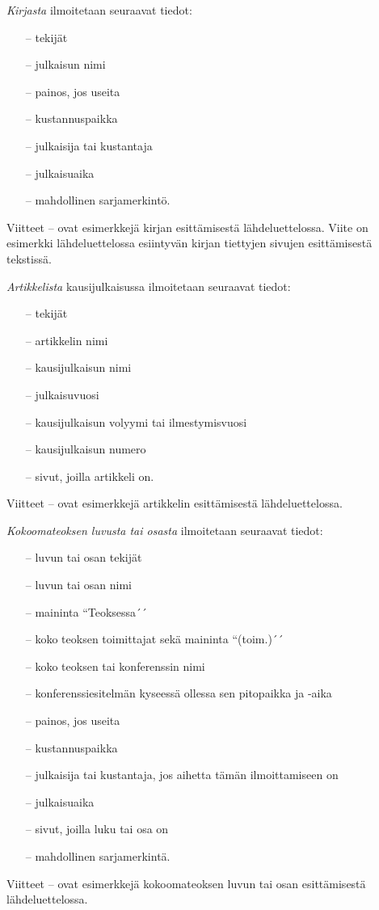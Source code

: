 \documentclass[finnish, 12pt, a4paper, elec, utf8, a-2b, online]{aaltothesis}
\begin{document}
\noindent
\textit{Kirjasta} ilmoitetaan seuraavat tiedot:
\begin{itemize}
\setlength{\itemsep}{-3pt}
	\item[--]tekijät 
	\item[--]julkaisun nimi
	\item[--]painos, jos useita
	\item[--]kustannuspaikka
	\item[--]julkaisija tai kustantaja
	\item[--]julkaisuaika
	\item[--]mahdollinen sarjamerkintö. 
\end{itemize}
Viitteet \cite{Kauranen}--\cite{Koblitz} ovat esimerkkejä kirjan esittämisestä 
lähdeluettelossa. Viite \cite[s.\ 83--124]{Koblitz} on esimerkki 
lähdeluettelossa esiintyvän kirjan tiettyjen sivujen esittämisestä tekstissä.

\noindent
\textit{Artikkelista} kausijulkaisussa ilmoitetaan seuraavat tiedot:
\begin{itemize}
\setlength{\itemsep}{-3pt}
	\item[--]tekijät
	\item[--]artikkelin nimi
	\item[--]kausijulkaisun nimi
	\item[--]julkaisuvuosi
	\item[--]kausijulkaisun volyymi tai ilmestymisvuosi
	\item[--]kausijulkaisun numero
	\item[--]sivut, joilla artikkeli on.
\end{itemize}
Viitteet \cite{bcs}--\cite{Deschamps} ovat esimerkkejä artikkelin esittämisestä 
lähdeluettelossa.

\noindent
\textit{Kokoomateoksen luvusta tai osasta} ilmoitetaan seuraavat tiedot:
\begin{itemize}
	\setlength{\itemsep}{-3pt}
	\item[--]luvun tai osan tekijät
	\item[--]luvun tai osan nimi
	\item[--]maininta ``Teoksessa´´
	\item[--]koko teoksen toimittajat sekä maininta ``(toim.)´´
	\item[--]koko teoksen tai konferenssin nimi
	\item[--]konferenssiesitelmän kyseessä ollessa sen pitopaikka ja -aika
	\item[--]painos, jos useita
	\item[--]kustannuspaikka
	\item[--]julkaisija tai kustantaja, jos aihetta tämän ilmoittamiseen on
	\item[--]julkaisuaika
	\item[--]sivut, joilla luku tai osa on 
	\item[--]mahdollinen sarjamerkintä.
\end{itemize}
Viitteet \cite{Sihvola}--\cite{Lindblom} ovat esimerkkejä kokoomateoksen luvun 
tai osan esittämisestä lähdeluettelossa. 
\end{document}
